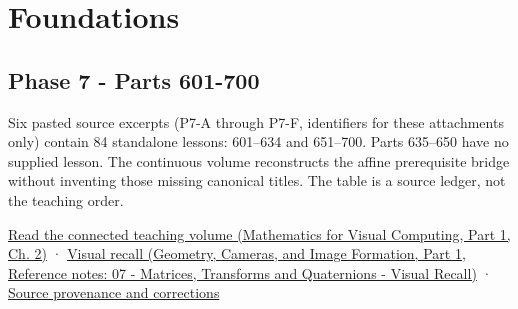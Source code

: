 \hypertarget{appendix-fd090d982a15}{}\label{referencestart:appendix-fd090d982a15}
\section{Foundations}\label{appendix-fd090d982a15-foundations}

\hypertarget{appendix-fd090d982a15-foundations}{}

\subsection{Phase 7 - Parts 601-700}\label{appendix-fd090d982a15-phase-7---parts-601-700}

\hypertarget{appendix-fd090d982a15-phase-7---parts-601-700}{}

Six pasted source excerpts (P7-A through P7-F, identifiers for these attachments only) contain 84 standalone lessons: 601--634 and 651--700. Parts 635--650 have no supplied lesson. The continuous volume reconstructs the affine prerequisite bridge without inventing those missing canonical titles. The table is a source ledger, not the teaching order.

\href{../02-Mathematics-for-Visual-Computing-P01/main.pdf\#nameddest=01-foundations-i-ch018-keep-the-promises-visible-while-moving-between-representations}{Read the connected teaching volume (Mathematics for Visual Computing, Part 1, Ch. 2)} · \href{../03-Geometry-Cameras-and-Image-Formation-P01/main.pdf\#nameddest=appendix-68f22c734be3}{Visual recall (Geometry, Cameras, and Image Formation, Part 1, Reference notes: 07 - Matrices, Transforms and Quaternions - Visual Recall)} · \hyperref[appendix-a103e7846d21-phase-7---source-analysis-and-verification]{Source provenance and corrections}

